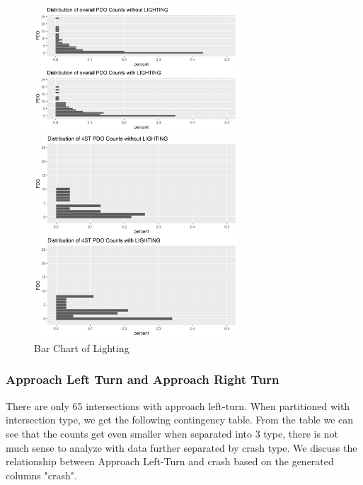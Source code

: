 \documentclass[11pt]{scrartcl} %
\begin{document}
\begin{figure}[H]
\begin{minipage}[t]{0.5\linewidth}
\centering
\includegraphics[width=3in]{image/LIGHTING_all_PDO.png}
\small
\end{minipage}
\begin{minipage}[t]{0.5\linewidth}
\centering
\includegraphics[width=3in]{image/LIGHTING_4ST_PDO.png}
\small
\end{minipage}
\caption{Bar Chart of Lighting}
\end{figure}

\subsubsection{Approach Left Turn and Approach Right Turn}

There are only 65 intersections with approach left-turn. When partitioned with intersection type, we get the following contingency table. From the table we can see that the counts get even smaller when separated into 3 type, there is not much sense to analyze with data further separated by crash type. We discuss the relationship between Approach Left-Turn and crash based on the generated columns "crash".
\end{document}
